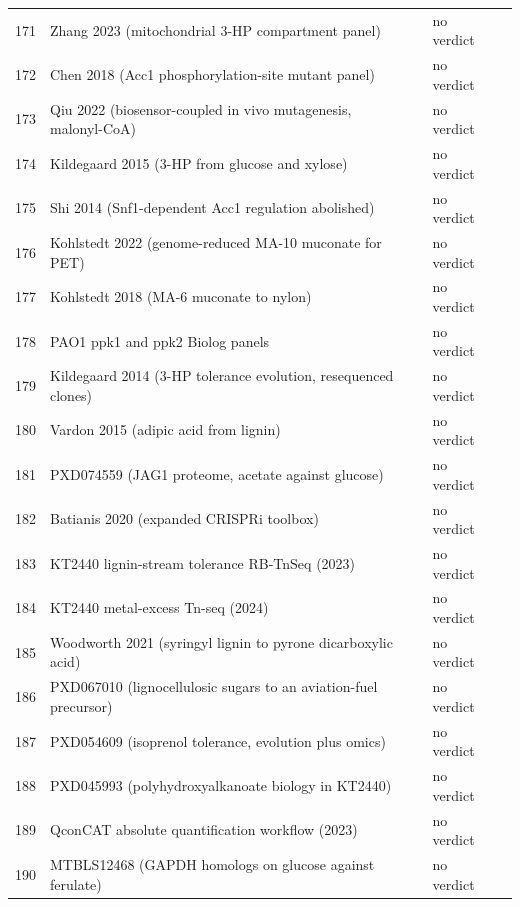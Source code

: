 \begin{longtable}{@{}r L{76mm} L{20mm} L{36mm} L{24mm}@{}}
171 & Zhang 2023 (mitochondrial 3-HP compartment panel) &  & no verdict &  \\
172 & Chen 2018 (Acc1 phosphorylation-site mutant panel) &  & no verdict &  \\
173 & Qiu 2022 (biosensor-coupled in vivo mutagenesis, malonyl-CoA) &  & no verdict &  \\
174 & Kildegaard 2015 (3-HP from glucose and xylose) &  & no verdict &  \\
175 & Shi 2014 (Snf1-dependent Acc1 regulation abolished) &  & no verdict &  \\
176 & Kohlstedt 2022 (genome-reduced MA-10 muconate for PET) &  & no verdict &  \\
177 & Kohlstedt 2018 (MA-6 muconate to nylon) &  & no verdict &  \\
178 & PAO1 ppk1 and ppk2 Biolog panels &  & no verdict &  \\
179 & Kildegaard 2014 (3-HP tolerance evolution, resequenced clones) &  & no verdict &  \\
180 & Vardon 2015 (adipic acid from lignin) &  & no verdict &  \\
181 & PXD074559 (JAG1 proteome, acetate against glucose) &  & no verdict &  \\
182 & Batianis 2020 (expanded CRISPRi toolbox) &  & no verdict &  \\
183 & KT2440 lignin-stream tolerance RB-TnSeq (2023) &  & no verdict &  \\
184 & KT2440 metal-excess Tn-seq (2024) &  & no verdict &  \\
185 & Woodworth 2021 (syringyl lignin to pyrone dicarboxylic acid) &  & no verdict &  \\
186 & PXD067010 (lignocellulosic sugars to an aviation-fuel precursor) &  & no verdict &  \\
187 & PXD054609 (isoprenol tolerance, evolution plus omics) &  & no verdict &  \\
188 & PXD045993 (polyhydroxyalkanoate biology in KT2440) &  & no verdict &  \\
189 & QconCAT absolute quantification workflow (2023) &  & no verdict &  \\
190 & MTBLS12468 (GAPDH homologs on glucose against ferulate) &  & no verdict &  \\

\end{longtable}
